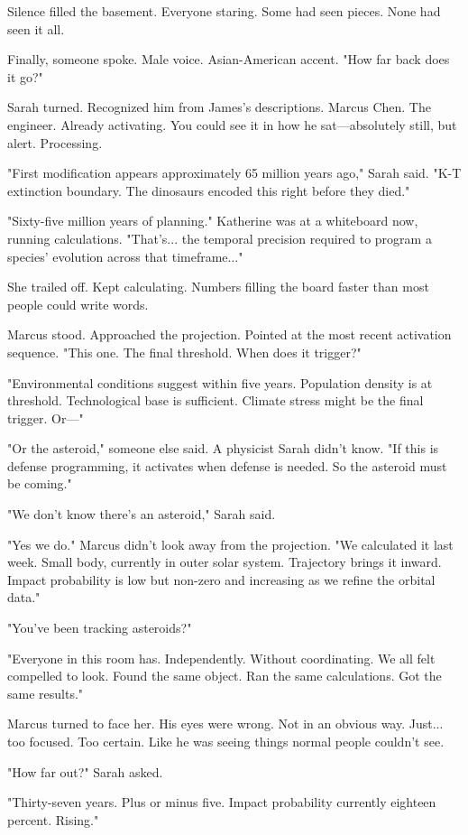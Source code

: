 Silence filled the basement. Everyone staring. Some had seen pieces. None had seen it all.

Finally, someone spoke. Male voice. Asian-American accent. "How far back does it go?"

Sarah turned. Recognized him from James's descriptions. Marcus Chen. The engineer. Already activating. You could see it in how he sat—absolutely still, but alert. Processing.

"First modification appears approximately 65 million years ago," Sarah said. "K-T extinction boundary. The dinosaurs encoded this right before they died."

"Sixty-five million years of planning." Katherine was at a whiteboard now, running calculations. "That's... the temporal precision required to program a species' evolution across that timeframe..."

She trailed off. Kept calculating. Numbers filling the board faster than most people could write words.

Marcus stood. Approached the projection. Pointed at the most recent activation sequence. "This one. The final threshold. When does it trigger?"

"Environmental conditions suggest within five years. Population density is at threshold. Technological base is sufficient. Climate stress might be the final trigger. Or—"

"Or the asteroid," someone else said. A physicist Sarah didn't know. "If this is defense programming, it activates when defense is needed. So the asteroid must be coming."

"We don't know there's an asteroid," Sarah said.

"Yes we do." Marcus didn't look away from the projection. "We calculated it last week. Small body, currently in outer solar system. Trajectory brings it inward. Impact probability is low but non-zero and increasing as we refine the orbital data."

"You've been tracking asteroids?"

"Everyone in this room has. Independently. Without coordinating. We all felt compelled to look. Found the same object. Ran the same calculations. Got the same results."

Marcus turned to face her. His eyes were wrong. Not in an obvious way. Just... too focused. Too certain. Like he was seeing things normal people couldn't see.

"How far out?" Sarah asked.

"Thirty-seven years. Plus or minus five. Impact probability currently eighteen percent. Rising."

